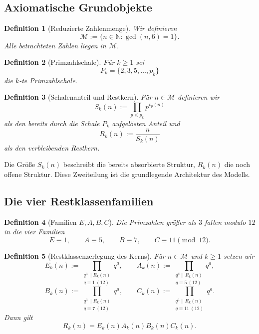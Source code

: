 \documentclass[11pt,a4paper]{article}
\newtheorem{definition}{Definition}[section]
\begin{document}
	\subsection{Axiomatische Grundobjekte}
	
	\begin{definition}[Reduzierte Zahlenmenge]
		\label{def:modell_M}
		Wir definieren
		\[
		\mathcal M:=\{n\in\mathbb N:\gcd(n,6)=1\}.
		\]
		Alle betrachteten Zahlen liegen in \(\mathcal M\).
	\end{definition}
	
	\begin{definition}[Primzahlschale]
		\label{def:modell_pk}
		Für \(k\ge 1\) sei
		\[
		P_k=\{2,3,5,\dots,p_k\}
		\]
		die \(k\)-te Primzahlschale.
	\end{definition}
	
	\begin{definition}[Schalenanteil und Restkern]
		\label{def:modell_sk_rk}
		Für \(n\in\mathcal M\) definieren wir
		\[
		S_k(n):=\prod_{p\le p_k} p^{v_p(n)}
		\]
		als den bereits durch die Schale \(P_k\) aufgelösten Anteil und
		\[
		R_k(n):=\frac{n}{S_k(n)}
		\]
		als den verbleibenden Restkern.
	\end{definition}
	
	\begin{bemerkung}
		Die Größe \(S_k(n)\) beschreibt die bereits absorbierte Struktur, \(R_k(n)\) die noch offene Struktur. Diese Zweiteilung ist die grundlegende Architektur des Modells.
	\end{bemerkung}
	
	\subsection{Die vier Restklassenfamilien}
	
	\begin{definition}[Familien \(E,A,B,C\)]
		\label{def:modell_eabc}
		Die Primzahlen größer als \(3\) fallen modulo \(12\) in die vier Familien
		\[
		E\equiv 1,\qquad
		A\equiv 5,\qquad
		B\equiv 7,\qquad
		C\equiv 11 \pmod{12}.
		\]
	\end{definition}
	
	\begin{definition}[Restklassenzerlegung des Kerns]
		\label{def:modell_zerlegung}
		Für \(n\in\mathcal M\) und \(k\ge 1\) setzen wir
		\[
		E_k(n):=\prod_{\substack{q^a\parallel R_k(n)\\ q\equiv 1\ (12)}} q^a,\qquad
		A_k(n):=\prod_{\substack{q^a\parallel R_k(n)\\ q\equiv 5\ (12)}} q^a,
		\]
		\[
		B_k(n):=\prod_{\substack{q^a\parallel R_k(n)\\ q\equiv 7\ (12)}} q^a,\qquad
		C_k(n):=\prod_{\substack{q^a\parallel R_k(n)\\ q\equiv 11\ (12)}} q^a.
		\]
		Dann gilt
		\[
		R_k(n)=E_k(n)A_k(n)B_k(n)C_k(n).
		\]
	\end{definition}
	
\end{document}
